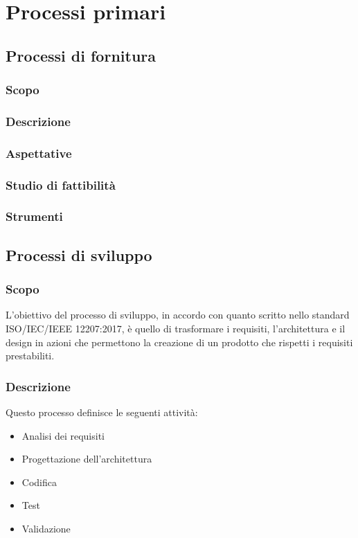 \section{Processi primari}


\subsection{Processi di fornitura}
\subsubsection{Scopo} 
\subsubsection{Descrizione}
\subsubsection{Aspettative}
\subsubsection{Studio di fattibilità}
\subsubsection{Strumenti}




\subsection{Processi di sviluppo}
\subsubsection{Scopo}
L'obiettivo del processo di sviluppo, in accordo con quanto scritto nello standard ISO/IEC/IEEE 12207:2017, è quello di trasformare i requisiti, l'architettura e il design in azioni che permettono la creazione di un prodotto che rispetti i requisiti prestabiliti.

\subsubsection{Descrizione}
Questo processo definisce le seguenti attività:
\begin{itemize}
  \item Analisi dei requisiti
  \item Progettazione dell'architettura
  \item Codifica
  \item Test
  \item Validazione
\end{itemize}

